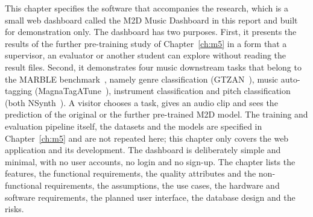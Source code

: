 \documentclass{FastFyp}
\begin{document}
This chapter specifies the software that accompanies the research, which is a small web dashboard called the M2D Music Dashboard in this report and built for demonstration only. The dashboard has two purposes. First, it presents the results of the further pre-training study of Chapter~\ref{ch:m5} in a form that a supervisor, an evaluator or another student can explore without reading the result files. Second, it demonstrates four music downstream tasks that belong to the MARBLE benchmark~\cite{ref:Yuan:2023marble}, namely genre classification (GTZAN~\cite{ref:Tzanetakis:2002genre}), music auto-tagging (MagnaTagATune~\cite{ref:Law:2009tagatune}), instrument classification and pitch classification (both NSynth~\cite{ref:Engel:2017nsynth}). A visitor chooses a task, gives an audio clip and sees the prediction of the original or the further pre-trained M2D model. The training and evaluation pipeline itself, the datasets and the models are specified in Chapter~\ref{ch:m5} and are not repeated here; this chapter only covers the web application and its development. The dashboard is deliberately simple and minimal, with no user accounts, no login and no sign-up. The chapter lists the features, the functional requirements, the quality attributes and the non-functional requirements, the assumptions, the use cases, the hardware and software requirements, the planned user interface, the database design and the risks.
\end{document}
